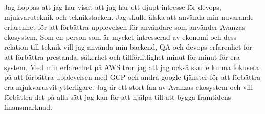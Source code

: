 \documentclass[../../main.tex]{subfiles}
\begin{document}
Jag hoppas att jag har visat att jag har ett djupt intresse för devops, mjukvaruteknik och teknikstacken. Jag skulle älska att använda min nuvarande erfarenhet för att förbättra upplevelsen för användare som använder Avanzas ekosystem. Som en person som är mycket intresserad av ekonomi och dess relation till teknik vill jag använda min backend, QA och devops erfarenhet för att förbättra prestanda, säkerhet och tillförlitlighet minut för minut för era system. Med min erfarenhet på AWS tror jag att jag också skulle kunna fokusera på att förbättra upplevelsen med GCP och andra google-tjänster för att förbättra era mjukvarusvit ytterligare. Jag är ett stort fan av Avanzas ekosystem och vill förbättra det på alla sätt jag kan för att hjälpa till att bygga framtidens finansmarknad.
\\
\end{document}
